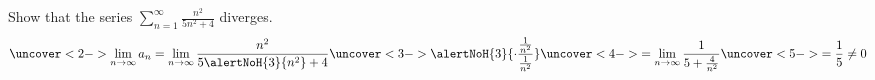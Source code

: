 \begin{frame}
\begin{example}
Show that the series $\sum_{n=1}^\infty \frac{n^2}{5n^2+4}$ diverges.
\[
\uncover<2->{%
\lim_{n\to\infty} a_n = \lim_{n\to\infty} \frac{n^2}{5\alertNoH{ 3}{n^2}+4}\uncover<3->{\alertNoH{ 3}{\cdot \frac{\frac{1}{n^2}}{\frac{1}{n^2}}}}%
}%
\uncover<4->{%
 = \lim_{n\to\infty} \frac{1}{5+\frac{4}{n^2}} %
}%
\uncover<5->{%
 = \frac{1}{5} \neq 0%
}%
\]
%
\end{example}
\end{frame}
